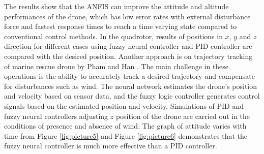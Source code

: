 The results show that the ANFIS can improve the attitude and altitude performances of the drone, which has low error rates with external disturbance force and fastest response times to reach a time varying state compared to conventional control methods. In the quadrotor, results of positions in $x$, $y$ and $z$ direction for different cases using fuzzy neural controller and PID controller are compared with the desired position. Another approach is on trajectory tracking of marine rescue drone by Pham and Han \cite{boxi7}. The main challenge in these operations is the ability to accurately track a desired trajectory and compensate for disturbances such as wind. The neural network estimates the drone's position and velocity based on sensor data, and the fuzzy logic controller generates control signals based on the estimated position and velocity. Simulations of PID and fuzzy neural controllers adjusting $z$ position of the drone are carried out in the conditions of presence and absence of wind. The graph of attitude varies with time from Figure \ref{fig:picture5} and Figure \ref{fig:picture6} demonstrates that the fuzzy neural controller is much more effective than a PID controller. 
